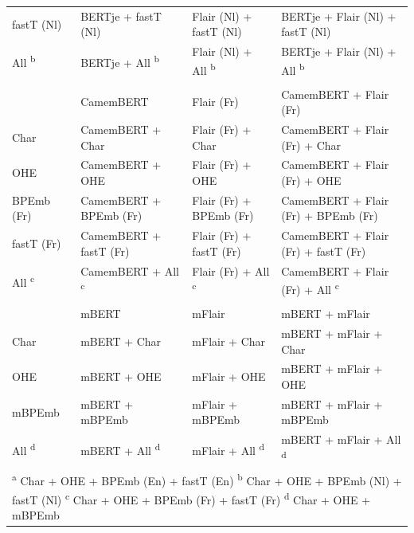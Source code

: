 \documentclass[12pt,a4paper,]{book}
\begin{document}
\begin{landscape}
\begin{table}
\begin{tabular}[t]{llll}
\hspace{1em}fastT (Nl) & BERTje + fastT (Nl) & Flair (Nl) + fastT (Nl) & BERTje + Flair (Nl) + fastT (Nl)\\
\hspace{1em}All \textsuperscript{b} & BERTje + All \textsuperscript{b} & Flair (Nl) + All \textsuperscript{b} & BERTje + Flair (Nl) + All \textsuperscript{b}\\
\addlinespace[0.3em]
\multicolumn{4}{l}{\textbf{French}}\\
\hspace{1em}\color{white}{n.a.} & CamemBERT & Flair (Fr) & CamemBERT + Flair (Fr)\\
\hspace{1em}Char & CamemBERT + Char & Flair (Fr) + Char & CamemBERT + Flair (Fr) + Char\\
\hspace{1em}OHE & CamemBERT + OHE & Flair (Fr) + OHE & CamemBERT + Flair (Fr) + OHE\\
\hspace{1em}BPEmb (Fr) & CamemBERT + BPEmb (Fr) & Flair (Fr) + BPEmb (Fr) & CamemBERT + Flair (Fr) + BPEmb (Fr)\\
\hspace{1em}fastT (Fr) & CamemBERT + fastT (Fr) & Flair (Fr) + fastT (Fr) & CamemBERT + Flair (Fr) + fastT (Fr)\\
\hspace{1em}All \textsuperscript{c} & CamemBERT + All \textsuperscript{c} & Flair (Fr) + All \textsuperscript{c} & CamemBERT + Flair (Fr) + All \textsuperscript{c}\\
\addlinespace[0.3em]
\multicolumn{4}{l}{\textbf{Multilingual}}\\
\hspace{1em}\color{white}{n.a.} & mBERT & mFlair & mBERT + mFlair\\
\hspace{1em}Char & mBERT + Char & mFlair + Char & mBERT + mFlair + Char\\
\hspace{1em}OHE & mBERT + OHE & mFlair + OHE & mBERT + mFlair + OHE\\
\hspace{1em}mBPEmb & mBERT + mBPEmb & mFlair + mBPEmb & mBERT + mFlair + mBPEmb\\
\hspace{1em}All \textsuperscript{d} & mBERT + All \textsuperscript{d} & mFlair + All \textsuperscript{d} & mBERT + mFlair + All \textsuperscript{d}\\
\bottomrule
\multicolumn{4}{l}{\textsuperscript{a} Char + OHE + BPEmb (En) + fastT (En) \textsuperscript{b} Char + OHE + BPEmb (Nl) + fastT (Nl) \textsuperscript{c} Char + OHE + BPEmb (Fr) + fastT (Fr) \textsuperscript{d} Char + OHE + mBPEmb}\\
\end{tabular}
\end{table}
\end{landscape}
\end{document}
